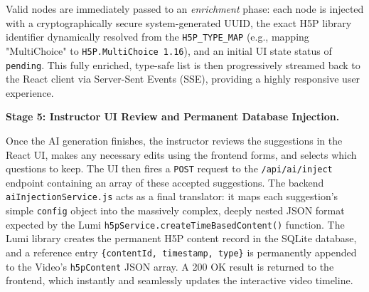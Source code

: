 Valid nodes are immediately passed to an \emph{enrichment} phase: each node is injected with a cryptographically secure system-generated UUID, the exact H5P library identifier dynamically resolved from the \texttt{H5P\_TYPE\_MAP} (e.g., mapping "MultiChoice" to \texttt{H5P.MultiChoice 1.16}), and an initial UI state status of \texttt{pending}. This fully enriched, type-safe list is then progressively streamed back to the React client via Server-Sent Events (SSE), providing a highly responsive user experience.

\textbf{Stage 5: Instructor UI Review and Permanent Database Injection.}

Once the AI generation finishes, the instructor reviews the suggestions in the React UI, makes any necessary edits using the frontend forms, and selects which questions to keep. The UI then fires a \texttt{POST} request to the \texttt{/api/ai/inject} endpoint containing an array of these accepted suggestions. The backend \texttt{aiInjectionService.js} acts as a final translator: it maps each suggestion's simple \texttt{config} object into the massively complex, deeply nested JSON format expected by the Lumi \texttt{h5pService.createTimeBasedContent()} function. The Lumi library creates the permanent H5P content record in the SQLite database, and a reference entry \texttt{\{contentId, timestamp, type\}} is permanently appended to the Video's \texttt{h5pContent} JSON array. A 200 OK result is returned to the frontend, which instantly and seamlessly updates the interactive video timeline.
